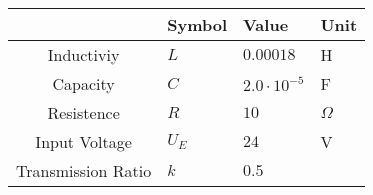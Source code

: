 \begin{tabular}{clll}
\hline
                    & Symbol   & Value               & Unit     \\
\hline
     Inductiviy     & $L$      & $0.00018$           & H        \\
      Capacity      & $C$      & $2.0 \cdot 10^{-5}$ & F        \\
     Resistence     & $R$      & $10$                & $\Omega$ \\
   Input Voltage    & $U_E$    & $24$                & V        \\
 Transmission Ratio & $k$      & $0.5$               &          \\
\hline
\end{tabular}